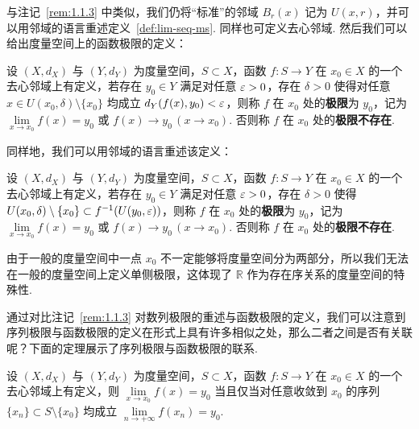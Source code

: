 \documentclass[../main.tex]{subfiles}
\begin{document}
与注记~\ref{rem:1.1.3} 中类似，我们仍将“标准”的邻域 $B_r(x)$ 记为 $U(x, r)$，并可以用邻域的语言重述定义~\ref{def:lim-seq-ms}. 同样也可定义去心邻域. 然后我们可以给出度量空间上的函数极限的定义：

\begin{definition}[度量空间上的函数极限的算术化定义] 
    设 $(X, d_X)$ 与 $(Y, d_Y)$ 为度量空间，$S \subset X$，函数 $f:S \to Y$ 在 $x_0 \in X$ 的一个去心邻域上有定义，若存在 $y_0 \in Y$ 满足对任意 $\varepsilon > 0$，存在 $\delta > 0$ 使得对任意 $x \in U(x_0, \delta) \setminus \{x_0\}$ 均成立 $d_Y(f(x), y_0) < \varepsilon$，则称 $f$ 在 $x_0$ 处的\textbf{极限}为 $y_0$，记为 $\lim\limits_{x \to x_0} f(x) = y_0$ 或 $f(x) \to y_0 \,(x \to x_0)$. 否则称 $f$ 在 $x_0$ 处的\textbf{极限不存在}. 
\end{definition}

同样地，我们可以用邻域的语言重述该定义：

\begin{definition} \label{def:lim-func-ms-nbh}
    设 $(X, d_X)$ 与 $(Y, d_Y)$ 为度量空间，$S \subset X$，函数 $f:S \to Y$ 在 $x_0 \in X$ 的一个去心邻域上有定义，若存在 $y_0 \in Y$ 满足对任意 $\varepsilon > 0$，存在 $\delta > 0$ 使得 $U(x_0, \delta) \setminus \{x_0\} \subset f^{-1}(U(y_0, \varepsilon))$，则称 $f$ 在 $x_0$ 处的\textbf{极限}为 $y_0$，记为 $\lim\limits_{x \to x_0} f(x) = y_0$ 或 $f(x) \to y_0 \,(x \to x_0)$. 否则称 $f$ 在 $x_0$ 处的\textbf{极限不存在}. 
\end{definition}

由于一般的度量空间中一点 $x_0$ 不一定能够将度量空间分为两部分，所以我们无法在一般的度量空间上定义单侧极限，这体现了 $\mathbb R$ 作为存在序关系的度量空间的特殊性. 


通过对比注记~\ref{rem:1.1.3} 对数列极限的重述与函数极限的定义，我们可以注意到序列极限与函数极限的定义在形式上具有许多相似之处，那么二者之间是否有关联呢？下面的定理展示了序列极限与函数极限的联系. 

\begin{theorem}[Heine 定理] \label{thm:Heine} 
    设 $(X, d_X)$ 与 $(Y, d_Y)$ 为度量空间，$S \subset X$，函数 $f:S \to Y$ 在 $x_0 \in X$ 的一个去心邻域上有定义，则 $\lim\limits_{x \to x_0} f(x) = y_0$ 当且仅当对任意收敛到 $x_0$ 的序列 $\{x_n\} \subset S \setminus \{x_0\}$ 均成立 $\lim\limits_{n \to +\infty} f(x_n) = y_0$. 
\end{theorem}
\end{document}
